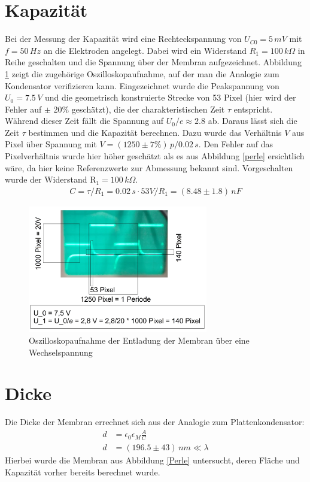 \documentclass{include/thesisclass3}
\newcommand{\e}[1]{\,\si{#1}}
\begin{document}
\section{Kapazität}
Bei der Messung der Kapazität wird eine Rechteckspannung von $U_{C0}=5\e{mV}$ mit $f=50\e{Hz}$ an die Elektroden angelegt. Dabei wird ein Widerstand $R_1=100\e{k\Omega}$ in Reihe geschalten und die Spannung über der Membran aufgezeichnet. Abbildung \ref{oszi} zeigt die zugehörige Oszilloskopaufnahme, auf der man die Analogie zum Kondensator verifizieren kann. Eingezeichnet wurde die Peakspannung von $U_0 = 7.5\e{V}$ und die geometrisch konstruierte Strecke von 53 Pixel (hier wird der Fehler auf $\pm$ 20\% geschätzt), die der charakteristischen Zeit $\tau$ entspricht. Während dieser Zeit fällt die Spannung auf $U_0/\textit{e}\approx 2.8$ ab. Daraus lässt sich die Zeit $\tau$ bestimmen und die Kapazität berechnen. Dazu wurde das Verhältnis $V$ aus Pixel über Spannung mit $V=(1250\pm7\%)\e{p}/0.02\e{s}$. Den Fehler auf das Pixelverhältnis wurde hier höher geschätzt als es aus Abbildung \ref{perle} ersichtlich wäre, da hier keine Referenzwerte zur Abmessung bekannt sind. Vorgeschalten wurde der Widerstand R$_1=100\e{k\Omega}$.
\begin{align}
C=\tau/ R_1 = 0.02\e{s}\cdot 53 V/R_1 = (8.48 \pm 1.8)\e{nF}
\end{align}
\begin{figure}[ht]
	\begin{center}
		\includegraphics[width=0.7\textwidth]{images/measure.png}
		\caption{Oszilloskopaufnahme der Entladung der Membran über eine Wechselspannung}
		\label{oszi}
	\end{center}
\end{figure}

\section{Dicke}
Die Dicke der Membran errechnet sich aus der Analogie zum Plattenkondensator:
\begin{align*}
	d&=\epsilon_0\epsilon_M \frac{A}{C}\\
	d&=(196.5 \pm 43)\e{nm} \ll \lambda
\end{align*}
Hierbei wurde die Membran aus Abbildung \ref{Perle} untersucht, deren Fläche und Kapazität vorher bereits berechnet wurde. 
\end{document}
